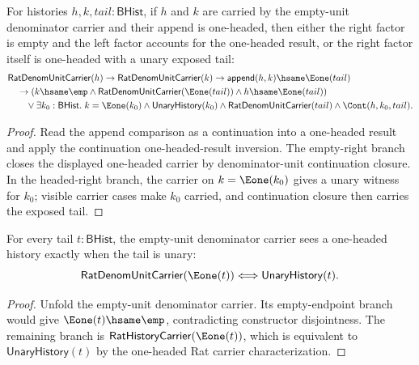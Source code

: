 \begin{theorem}
\label{thm:rat-denom-unit-carrier-append-e1-result-cases}
For histories \(h,k,tail:\mathsf{BHist}\), if \(h\) and \(k\) are carried by
the empty-unit denominator carrier and their append is one-headed, then either
the right factor is empty and the left factor accounts for the one-headed
result, or the right factor itself is one-headed with a unary exposed tail:
$$
\begin{aligned}
&\mathsf{RatDenomUnitCarrier}(h)\to
\mathsf{RatDenomUnitCarrier}(k)\to
\mathsf{append}(h,k)\hsame\Eone(tail)\\
&\quad\to
\left(k\hsame\emp\land
  \mathsf{RatDenomUnitCarrier}(\Eone(tail))\land h\hsame\Eone(tail)\right)\\
&\qquad{}\lor
\exists k_0:\mathsf{BHist}.\;
  k=\Eone(k_0)\land\mathsf{UnaryHistory}(k_0)\land
  \mathsf{RatDenomUnitCarrier}(tail)\land\Cont(h,k_0,tail).
\end{aligned}
$$
\end{theorem}
\begin{proof}
Read the append comparison as a continuation into a one-headed result and
apply the continuation one-headed-result inversion. The empty-right branch
closes the displayed one-headed carrier by denominator-unit continuation
closure. In the headed-right branch, the carrier on \(k=\Eone(k_0)\) gives a
unary witness for \(k_0\); visible carrier cases make \(k_0\) carried, and
continuation closure then carries the exposed tail.
\end{proof}

\begin{theorem}
\label{thm:field-rat-denom-unit-carrier-one-headed-unary-iff}
For every tail $t:\mathsf{BHist}$, the empty-unit denominator carrier sees a
one-headed history exactly when the tail is unary:
$$
\mathsf{RatDenomUnitCarrier}(\Eone(t))
\Longleftrightarrow
\mathsf{UnaryHistory}(t).
$$
\end{theorem}
\begin{proof}
Unfold the empty-unit denominator carrier. Its empty-endpoint branch would give
$\Eone(t)\hsame\emp$, contradicting constructor disjointness. The remaining
branch is $\mathsf{RatHistoryCarrier}(\Eone(t))$, which is equivalent to
$\mathsf{UnaryHistory}(t)$ by the one-headed Rat carrier characterization.
\end{proof}

